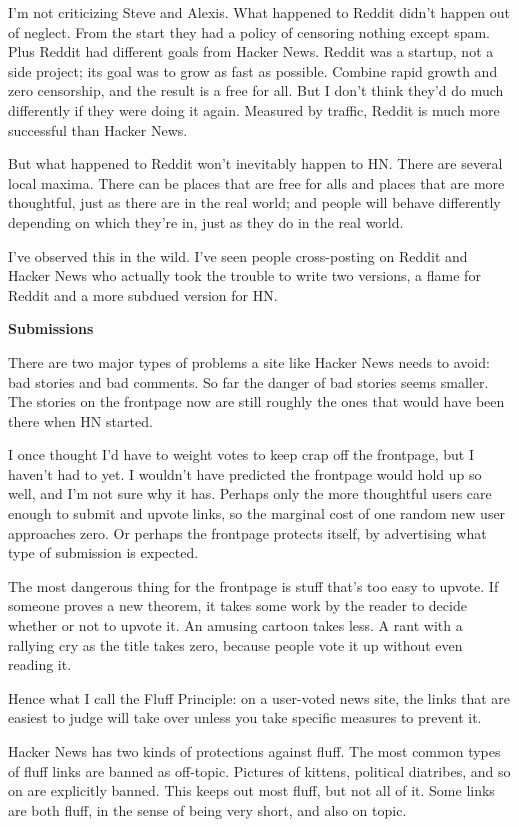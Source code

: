 I'm not criticizing Steve and Alexis. What happened to Reddit didn't
happen out of neglect. From the start they had a policy of censoring
nothing except spam. Plus Reddit had different goals from Hacker News.
Reddit was a startup, not a side project; its goal was to grow as fast
as possible. Combine rapid growth and zero censorship, and the result is
a free for all. But I don't think they'd do much differently if they
were doing it again. Measured by traffic, Reddit is much more successful
than Hacker News.

But what happened to Reddit won't inevitably happen to HN. There are
several local maxima. There can be places that are free for alls and
places that are more thoughtful, just as there are in the real world;
and people will behave differently depending on which they're in, just
as they do in the real world.

I've observed this in the wild. I've seen people cross-posting on Reddit
and Hacker News who actually took the trouble to write two versions, a
flame for Reddit and a more subdued version for HN.

\textbf{Submissions}

There are two major types of problems a site like Hacker News needs to
avoid: bad stories and bad comments. So far the danger of bad stories
seems smaller. The stories on the frontpage now are still roughly the
ones that would have been there when HN started.

I once thought I'd have to weight votes to keep crap off the frontpage,
but I haven't had to yet. I wouldn't have predicted the frontpage would
hold up so well, and I'm not sure why it has. Perhaps only the more
thoughtful users care enough to submit and upvote links, so the marginal
cost of one random new user approaches zero. Or perhaps the frontpage
protects itself, by advertising what type of submission is expected.

The most dangerous thing for the frontpage is stuff that's too easy to
upvote. If someone proves a new theorem, it takes some work by the
reader to decide whether or not to upvote it. An amusing cartoon takes
less. A rant with a rallying cry as the title takes zero, because people
vote it up without even reading it.

Hence what I call the Fluff Principle: on a user-voted news site, the
links that are easiest to judge will take over unless you take specific
measures to prevent it.

Hacker News has two kinds of protections against fluff. The most common
types of fluff links are banned as off-topic. Pictures of kittens,
political diatribes, and so on are explicitly banned. This keeps out
most fluff, but not all of it. Some links are both fluff, in the sense
of being very short, and also on topic.

